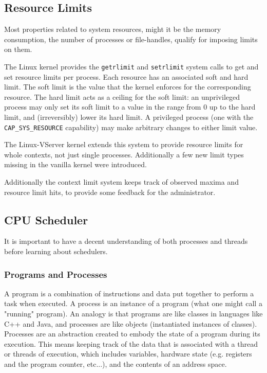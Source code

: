 \subsection{Resource Limits}

Most properties related to system resources, might it be the memory
consumption, the number of processes or file-handles, qualify for imposing
limits on them. 

The Linux kernel provides the \verb,getrlimit, and \verb,setrlimit, system
calls to get and set resource limits per process. Each resource has an
associated soft and hard limit. The soft limit is the value that the kernel
enforces for the corresponding resource. The hard limit acts as a ceiling for
the soft limit: an unprivileged process may only set its soft limit to a value
in the range from 0 up to the hard limit, and (irreversibly) lower its hard
limit. A privileged process (one with the \verb,CAP_SYS_RESOURCE, capability)
may make arbitrary changes to either limit value. 

The Linux-VServer kernel extends this system to provide resource limits for
whole contexts, not just single processes. Additionally a few new limit types
missing in the vanilla kernel were introduced. 

Additionally the context limit system keeps track of observed maxima and
resource limit hits, to provide some feedback for the administrator.


\subsection{CPU Scheduler}

It is important to have a decent understanding of both processes and threads
before learning about schedulers.

\subsubsection{Programs and Processes}

A program is a combination of instructions and data put together to perform a
task when executed. A process is an instance of a program (what one might call
a "running" program). An analogy is that programs are like classes in languages
like C++ and Java, and processes are like objects (instantiated instances of
classes). Processes are an abstraction created to embody the state of a program
during its execution. This means keeping track of the data that is associated
with a thread or threads of execution, which includes variables, hardware state
(e.g. registers and the program counter, etc...), and the contents of an
address space.

